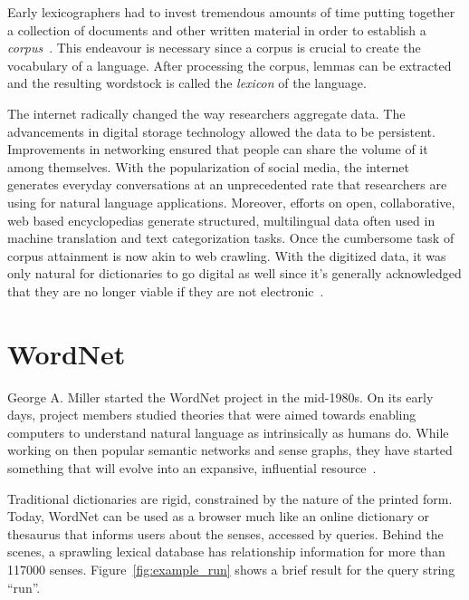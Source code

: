 Early lexicographers had to invest tremendous amounts of time putting together a collection of documents and other written material in order to establish a \emph{corpus}~\cite{uzun_1945ten_1999}.
This endeavour is necessary since a corpus is crucial to create the vocabulary of a language.
After processing the corpus, lemmas can be extracted and the resulting wordstock is called the \emph{lexicon} of the language.

The internet radically changed the way researchers aggregate data.
The advancements in digital storage technology allowed the data to be persistent.
Improvements in networking ensured that people can share the volume of it among themselves.
With the popularization of social media, the internet generates everyday conversations at an unprecedented rate that researchers are using for natural language applications. %
Moreover,  efforts on open, collaborative, web based encyclopedias generate structured, multilingual data often used in machine translation and text categorization tasks. %
Once the cumbersome task of corpus attainment is now akin to web crawling.
With the digitized data, it was only natural for dictionaries to go digital as well since it's generally acknowledged that they are no longer viable if they are not electronic~\cite{sterkenburg_practical_2003}.

\section{WordNet}%
\label{sec:wordnet}
George A\@. Miller started the WordNet project in the mid-1980s.
On its early days, project members studied theories that were aimed towards enabling computers to understand natural language as intrinsically as humans do.
While working on then popular semantic networks and sense graphs, they have started something that will evolve into an expansive, influential resource~\cite{fellbaum_wordnet_1998}.

Traditional dictionaries are rigid, constrained by the nature of the printed form.
Today, WordNet can be used as a browser much like an online dictionary or thesaurus that informs users about the senses, accessed by queries.
Behind the scenes, a sprawling lexical database has relationship information for more than 117000 senses. %
Figure~\ref{fig:example_run} shows a brief result for the query string \enquote{run}.

